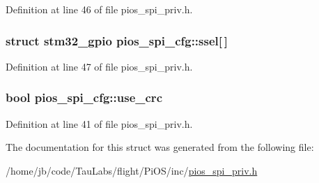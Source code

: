 \-Definition at line 46 of file pios\-\_\-spi\-\_\-priv.\-h.

\hypertarget{structpios__spi__cfg_ac1c73f49ee01a82a50dff4f2eb0fbb8e}{
\subsubsection[{ssel}]{\setlength{\rightskip}{0pt plus 5cm}struct {\bf stm32\-\_\-gpio} {\bf pios\-\_\-spi\-\_\-cfg\-::ssel}\mbox{[}$\,$\mbox{]}}}\label{structpios__spi__cfg_ac1c73f49ee01a82a50dff4f2eb0fbb8e}


\-Definition at line 47 of file pios\-\_\-spi\-\_\-priv.\-h.

\hypertarget{structpios__spi__cfg_a0ec6229d3970d89ba04dfe718bb68607}{
\subsubsection[{use\-\_\-crc}]{\setlength{\rightskip}{0pt plus 5cm}bool {\bf pios\-\_\-spi\-\_\-cfg\-::use\-\_\-crc}}}\label{structpios__spi__cfg_a0ec6229d3970d89ba04dfe718bb68607}


\-Definition at line 41 of file pios\-\_\-spi\-\_\-priv.\-h.



\-The documentation for this struct was generated from the following file\-:\begin{DoxyCompactItemize}
\item 
/home/jb/code/\-Tau\-Labs/flight/\-Pi\-O\-S/inc/\hyperlink{pios__spi__priv_8h}{pios\-\_\-spi\-\_\-priv.\-h}\end{DoxyCompactItemize}
